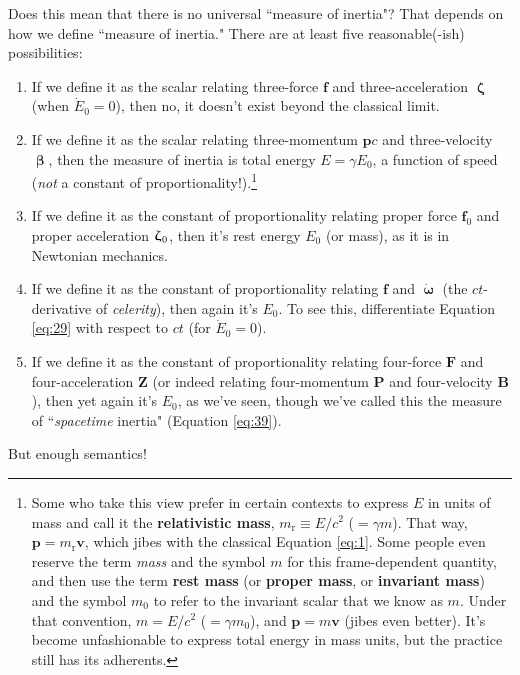 \documentclass[12pt]{article}
\renewcommand{\vv}[1]{\mathbf{#1}}
\newcommand{\vvbeta}{\bm{\upbeta}}
\newcommand{\vvomega}{\bm{\upomega}}
\newcommand{\vvzeta}{\bm{\upzeta}}
\begin{document}
Does this mean that there is no universal ``measure of inertia"? That depends on how we define ``measure of inertia." There are at least five reasonable(-ish) possibilities:
\begin{enumerate}
\item If we define it as the scalar relating three-force $\vv f$ and three-acceleration $\vvzeta$ (when $\dot{E}_0 = 0$), then no, it doesn't exist beyond the classical limit.
\item If we define it as the scalar relating three-momentum $\vv p c$ and three-velocity $\vvbeta$, then the measure of inertia is total energy $E = \gamma E_0$, a function of speed (\emph{not} a constant of proportionality!).\footnote{\label{fn:rm}Some who take this view prefer in certain contexts to express $E$ in units of mass and call it the \textbf{relativistic mass}, $m_{\textrm{r}} \equiv E / c^2$ ($= \gamma m$). That way, $\vv p = m_{\textrm{r}} \vv v$, which jibes with the classical Equation \ref{eq:1}. Some people even reserve the term \emph{mass} and the symbol $m$ for this frame-dependent quantity, and then use the term \textbf{rest mass} (or \textbf{proper mass}, or \textbf{invariant mass}) and the symbol $m_0$ to refer to the invariant scalar that we know as $m$. Under that convention, $m = E / c^2$ ($ = \gamma m_0$), and $\vv p = m \vv v$ (jibes even better). It's become unfashionable to express total energy in mass units, but the practice still has its adherents.}
\item If we define it as the constant of proportionality relating proper force $\vv f_0$ and proper acceleration $\vvzeta_{\mkern1mu 0}$, then it's rest energy $E_0$ (or mass), as it is in Newtonian mechanics.
\item If we define it as the constant of proportionality relating $\vv f$ and $\dot{\vvomega}$ (the $ct$-derivative of \emph{celerity}), then again it's $E_0$. To see this, differentiate Equation \ref{eq:29} with respect to $ct$ (for $\dot{E}_0 = 0$).
\item If we define it as the constant of proportionality relating four-force $\vv F$ and four-acceleration $\vv Z$ (or indeed relating four-momentum $\vv P$ and four-velocity $\vv B$), then yet again it's $E_0$, as we've seen, though we've called this the measure of ``\emph{spacetime} inertia" (Equation \ref{eq:39}).
\end{enumerate}

But enough semantics!
\end{document}
